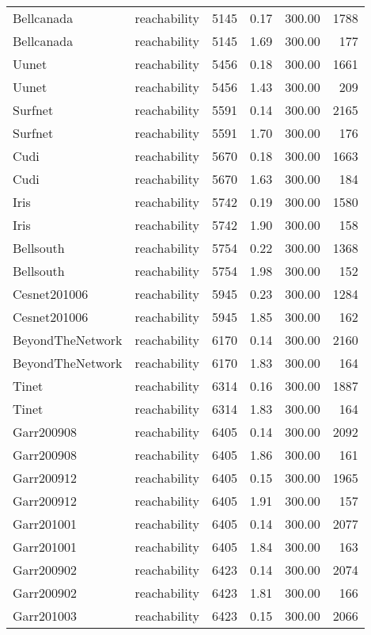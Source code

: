 \begin{tabular}{llrrrr}
Bellcanada & reachability & 5145 & 0.17 & 300.00 & 1788 \\
Bellcanada & reachability & 5145 & 1.69 & 300.00 & 177 \\
Uunet & reachability & 5456 & 0.18 & 300.00 & 1661 \\
Uunet & reachability & 5456 & 1.43 & 300.00 & 209 \\
Surfnet & reachability & 5591 & 0.14 & 300.00 & 2165 \\
Surfnet & reachability & 5591 & 1.70 & 300.00 & 176 \\
Cudi & reachability & 5670 & 0.18 & 300.00 & 1663 \\
Cudi & reachability & 5670 & 1.63 & 300.00 & 184 \\
Iris & reachability & 5742 & 0.19 & 300.00 & 1580 \\
Iris & reachability & 5742 & 1.90 & 300.00 & 158 \\
Bellsouth & reachability & 5754 & 0.22 & 300.00 & 1368 \\
Bellsouth & reachability & 5754 & 1.98 & 300.00 & 152 \\
Cesnet201006 & reachability & 5945 & 0.23 & 300.00 & 1284 \\
Cesnet201006 & reachability & 5945 & 1.85 & 300.00 & 162 \\
BeyondTheNetwork & reachability & 6170 & 0.14 & 300.00 & 2160 \\
BeyondTheNetwork & reachability & 6170 & 1.83 & 300.00 & 164 \\
Tinet & reachability & 6314 & 0.16 & 300.00 & 1887 \\
Tinet & reachability & 6314 & 1.83 & 300.00 & 164 \\
Garr200908 & reachability & 6405 & 0.14 & 300.00 & 2092 \\
Garr200908 & reachability & 6405 & 1.86 & 300.00 & 161 \\
Garr200912 & reachability & 6405 & 0.15 & 300.00 & 1965 \\
Garr200912 & reachability & 6405 & 1.91 & 300.00 & 157 \\
Garr201001 & reachability & 6405 & 0.14 & 300.00 & 2077 \\
Garr201001 & reachability & 6405 & 1.84 & 300.00 & 163 \\
Garr200902 & reachability & 6423 & 0.14 & 300.00 & 2074 \\
Garr200902 & reachability & 6423 & 1.81 & 300.00 & 166 \\
Garr201003 & reachability & 6423 & 0.15 & 300.00 & 2066 \\

\end{tabular}
